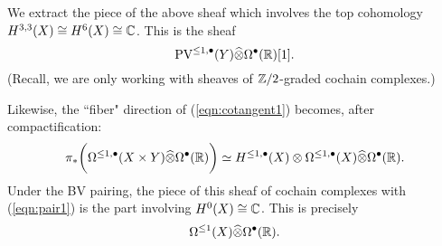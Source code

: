 \documentclass[11pt]{article}
\newcommand\bu{\bullet}
\def\Hat{\widehat}
\begin{document}
We extract the piece of the above sheaf which involves the top cohomology $H^{3,3}(X) \cong H^6(X) \cong \mathbb{C}$. 
This is the sheaf
\begin{equation}\label{eqn:pair1}
\PV^{\leq 1, \bu}(Y) \Hat{\otimes} \Omega^\bu (\mb R) [1] .
\end{equation}
(Recall, we are only working with sheaves of $\mathbb{Z}/2$-graded cochain complexes.)

Likewise, the ``fiber" direction of (\ref{eqn:cotangent1}) becomes, after compactification:
\[
\pi_* \bigg(\Omega^{\leq 1, \bu}(X \times Y) \Hat{\otimes} \Omega^\bu(\mb R) \bigg) \simeq H^{\leq 1, \bu}(X) \otimes \Omega^{\leq 1, \bu} (X) \Hat{\otimes} \Omega^\bu (\mb R)  .
\]
Under the BV pairing, the piece of this sheaf of cochain complexes with (\ref{eqn:pair1}) is the part involving $H^0(X) \cong \mathbb{C}$.
This is precisely
\[
\Omega^{\leq 1}(X) \Hat{\otimes} \Omega^\bu (\mb R) .
\] 
\end{document}
